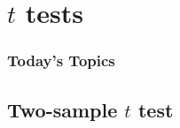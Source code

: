 \documentclass[color=usenames,dvipsnames]{beamer}\usepackage[]{graphicx}\usepackage[]{color}
\makeatletter
\def\maxwidth{ %
  \ifdim\Gin@nat@width>\linewidth
    \linewidth
  \else
    \Gin@nat@width
  \fi
}
\newenvironment{knitrout}{}{} %
\makeatother
\begin{document}
\section{$t$ tests}




\begin{frame}[plain]
  \frametitle{Today's Topics}
  \Large
\end{frame}



\subsection{Two-sample $t$ test}



\begin{comment}
\begin{frame}
  \frametitle{Conceptual Example}
  \begin{itemize}
    \item The (unknown) population means are:
      \begin{itemize}
        \item $\mu_A = 5$
        \item $\mu_B = 7$
      \end{itemize}
    \item Both populations have variance $\sigma^2 = 4$.
    \item We collect 2 samples, each with $n=15$
    \item The sample means are:
      \begin{itemize}
        \item $\bar{y_1}$
      \end{itemize}
  \end{itemize}
\end{frame}
\end{comment}



\begin{comment}
\begin{frame}[fragile]
  \frametitle{Example}
  \vspace{-0.5cm}
\begin{center}
\begin{knitrout}
\definecolor{shadecolor}{rgb}{0.878, 0.918, 0.933}\color{fgcolor}
\texttt{[image: figure/popsamp-1]} 

\end{knitrout}
\end{center}
\end{frame}
\end{comment}
\end{document}
